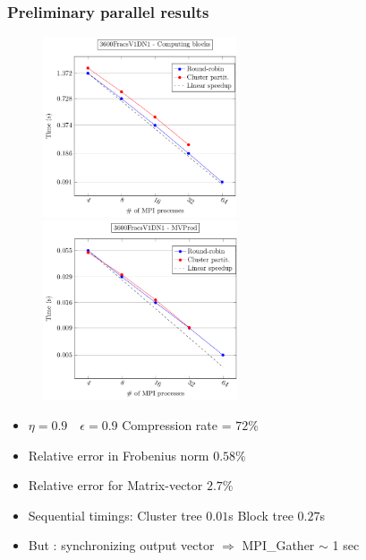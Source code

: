 \begin{frame}
\frametitle{Preliminary parallel results}

\begin{figure}
\vspace{-0.5cm}
\hspace{-0.8cm}
\includegraphics[height = 5.3cm]{../images/scaling_3600_blocks.pdf}
\includegraphics[height = 5.3cm]{../images/scaling_3600_mvprod.pdf}
\vspace{-0.5cm}
\end{figure}

\begin{itemize}
\item $\eta = 0.9 \quad \epsilon = 0.9$  \quad Compression rate = $72\%$
\item Relative error in Frobenius norm $0.58\%$
\item Relative error for Matrix-vector $2.7\%$
\item Sequential timings: Cluster tree $0.01$s \quad Block tree $0.27$s
\item  \alert{But : synchronizing output vector $\Rightarrow$ MPI\_Gather $\sim$ 1 sec}
\end{itemize}
\end{frame}

